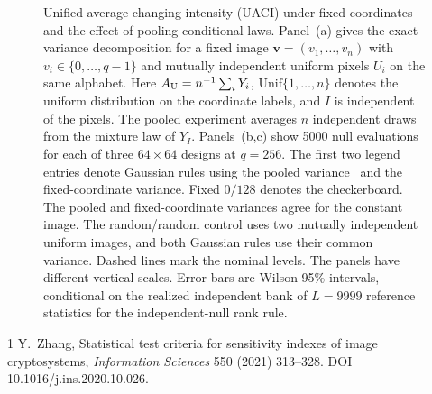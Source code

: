 \documentclass[10pt,a4paper]{article}
\begin{document}
\begin{figure}[H]
\par\smallskip
{}
\endgroup
\caption*{Unified average changing intensity (UACI) under fixed coordinates and the effect of pooling conditional laws. Panel~(a) gives the exact variance decomposition for a fixed image $\boldsymbol{v}=(v_1,\ldots,v_n)$ with $v_i\in\{0,\ldots,q-1\}$ and mutually independent uniform pixels $U_i$ on the same alphabet. Here $A_{\rm U}=n^{-1}\sum_iY_i$, $\mathrm{Unif}\{1,\ldots,n\}$ denotes the uniform distribution on the coordinate labels, and $I$ is independent of the pixels. The pooled experiment averages $n$ independent draws from the mixture law of $Y_I$. Panels~(b,c) show 5000 null evaluations for each of three $64\times64$ designs at $q=256$. The first two legend entries denote Gaussian rules using the pooled variance~\cite{zhang2021} and the fixed-coordinate variance. Fixed $0/128$ denotes the checkerboard. The pooled and fixed-coordinate variances agree for the constant image. The random/random control uses two mutually independent uniform images, and both Gaussian rules use their common variance. Dashed lines mark the nominal levels. The panels have different vertical scales. Error bars are Wilson 95\% intervals, conditional on the realized independent bank of $L=9999$ reference statistics for the independent-null rank rule.}
\end{figure}

\vspace{-4pt}
{\small
\renewcommand{\refname}{Reference}
\begin{thebibliography}{1}
Y.~Zhang, Statistical test criteria for sensitivity indexes of image cryptosystems,
\emph{Information Sciences} 550 (2021) 313--328.
DOI 10.1016/j.ins.2020.10.026.
\end{thebibliography}
}
\end{document}
